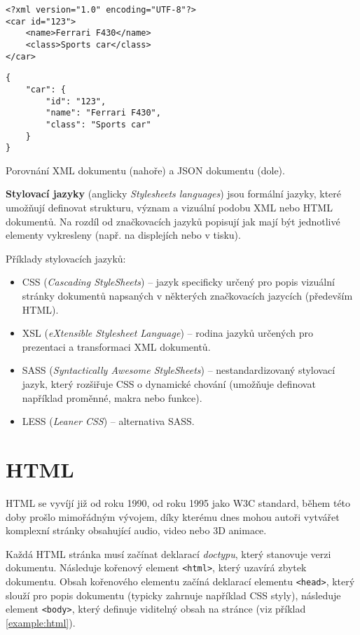 \begin{example}
    \centering
    \begin{lstlisting}
<?xml version="1.0" encoding="UTF-8"?>
<car id="123">
    <name>Ferrari F430</name>
    <class>Sports car</class>
</car>
    \end{lstlisting}
    \begin{lstlisting}
{
    "car": {
        "id": "123",
        "name": "Ferrari F430",
        "class": "Sports car"
    }
}
    \end{lstlisting}
    \caption{Porovnání XML dokumentu (nahoře) a JSON dokumentu (dole).}
    \label{example:xml-vs-json}
\end{example}

\textbf{Stylovací jazyky} (anglicky \textit{Stylesheets languages}) jsou formální jazyky, které umožňují definovat strukturu, význam a vizuální podobu XML nebo HTML dokumentů. Na rozdíl od značkovacích jazyků popisují jak mají být jednotlivé elementy vykresleny (např. na displejích nebo v tisku). \cite{16}

Příklady stylovacích jazyků:

\begin{itemize}
    \item CSS (\textit{Cascading StyleSheets}) -- jazyk specificky určený pro popis vizuální stránky dokumentů napsaných v některých značkovacích jazycích (především HTML).
    \item XSL (\textit{eXtensible Stylesheet Language}) -- rodina jazyků určených pro prezentaci a transformaci XML dokumentů.
    \item SASS (\textit{Syntactically Awesome StyleSheets}) -- nestandardizovaný stylovací jazyk, který rozšiřuje CSS o dynamické chování (umožňuje definovat například proměnné, makra nebo funkce).
    \item LESS (\textit{Leaner CSS}) -- alternativa SASS.
\end{itemize}

\section{HTML}
\label{sec:html}

HTML se vyvíjí již od roku 1990, od roku 1995 jako W3C standard, během této doby prošlo mimořádným vývojem, díky kterému dnes mohou autoři vytvářet komplexní stránky obsahující audio, video nebo 3D animace.

Každá HTML stránka musí začínat deklarací \textit{doctypu}, který stanovuje verzi dokumentu. Následuje kořenový element \texttt{<html>}, který uzavírá zbytek dokumentu. Obsah kořenového elementu začíná deklarací elementu \texttt{<head>}, který slouží pro popis dokumentu (typicky zahrnuje například CSS styly), následuje element \texttt{<body>}, který definuje viditelný obsah na stránce (viz příklad \ref{example:html}).

